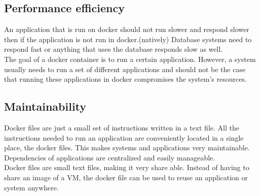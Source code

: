 \subsection{Performance efficiency}
An application that is run on docker should not run slower and respond slower then if the application is not run in docker.\ign(natively) Database systems need to respond fast or anything that uses the database responds slow as well.\\
The goal of a docker container is to run a certain application. However, a system usually needs to run a set of different applications and should not be the case that running these applications in docker compromises the system's resources.\\

\subsection{Maintainability}
Docker files are just a small set of instructions written in a text file. All the instructions needed to run an application are conveniently located in a single place, the docker files. This makes systems and applications very maintainable.\\
Dependencies of applications are centralized and easily manageable.\\
Docker files are small text files, making it very share able. Instead of having to share an image of a VM, the docker file can be used to reuse an application or system anywhere.\\